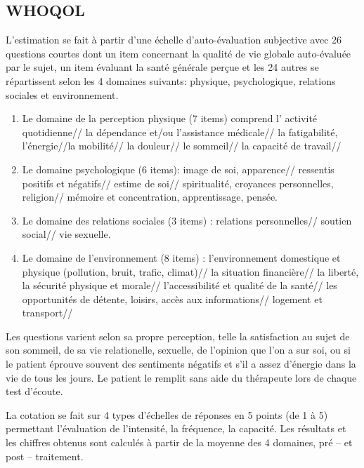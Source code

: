 \subsection*{WHOQOL}
L'estimation se fait à partir d'une échelle
d'auto-évaluation subjective avec 26 questions courtes
dont un item concernant la qualité de vie globale
auto-évaluée par le sujet, un item évaluant la santé générale perçue
et les 24 autres se répartissent selon les 4 domaines suivants: physique, psychologique, relations 
sociales et environnement.
\begin{enumerate}
	\item  Le domaine de la perception physique (7 items) comprend l' activité quotidienne// la dépendance 
	et/ou l'assistance médicale// la fatigabilité, l'énergie//la mobilité// la douleur// le sommeil// la capacité 
	de travail//
	\item Le domaine psychologique (6 items):  image de soi, apparence// ressentis positifs et négatifs// 
	estime de soi// spiritualité, croyances personnelles, religion// mémoire et concentration, apprentissage, 
	pensée.
	\item Le domaine des relations sociales (3 items) : relations personnelles// soutien social// vie sexuelle.
	\item Le domaine de l'environnement (8 items) :
	l'environnement domestique et physique
	(pollution, bruit, trafic, climat)// la
	situation financière//  la liberté, la
	sécurité physique et morale//
	l'accessibilité et qualité de la santé// les
	opportunités de détente, loisirs, accès aux
	informations// logement et transport//
\end{enumerate}
Les questions varient selon sa propre perception, telle la satisfaction
au sujet de son  sommeil, de sa vie relationelle, sexuelle, de
l'opinion que l'on a sur soi, ou si le patient éprouve souvent des sentiments négatifs
et s'il a assez d'énergie dans la vie de tous les jours.
Le patient le remplit sans aide du
thérapeute lors de chaque test
d'écoute.

La cotation se fait sur 4 types d'échelles de réponses en 5 points (de 1 à 5)
permettant l'évaluation de l'intensité, la fréquence, la capacité.
Les résultats et les chiffres obtenus  sont calculés à partir de la moyenne des 4
domaines, pré -- et post -- traitement.

